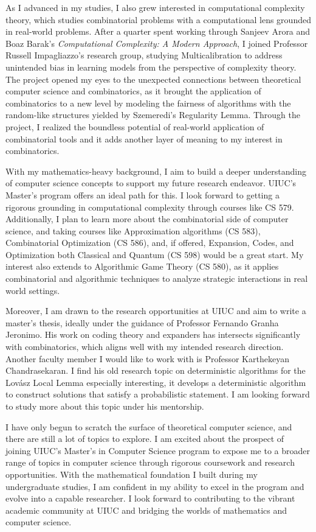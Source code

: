 \documentclass[12pt]{article}
\begin{document}
As I advanced in my studies, I also grew interested in computational complexity theory, which
studies combinatorial problems with a computational lens grounded in real-world problems. After a
quarter spent working through Sanjeev Arora and Boaz Barak's \textit{Computational Complexity: A
Modern Approach}\cite{arora2009computational}, I joined Professor Russell Impagliazzo's research
group, studying Multicalibration to address unintended bias in learning models from the perspective
of complexity theory. The project opened my eyes to the unexpected connections between theoretical
computer science and combinatorics, as it brought the application of combinatorics to a new level by
modeling the fairness of algorithms with the random-like structures yielded by Szemeredi's
Regularity Lemma. Through the project, I realized the boundless potential of real-world application
of combinatorial tools and it adds another layer of meaning to my interest in combinatorics.

With my mathematics-heavy background, I aim to build a deeper understanding of computer science
concepts to support my future research endeavor. UIUC's Master's program offers an ideal path for
this. I look forward to getting a rigorous grounding in computational complexity through courses
like CS 579. Additionally, I plan to learn more about the combinatorial side of computer science,
and taking courses like Approximation algorithms (CS 583), Combinatorial Optimization (CS 586), and,
if offered, Expansion, Codes, and Optimization both Classical and Quantum (CS 598) would be a great
start. My interest also extends to Algorithmic Game Theory (CS 580), as it applies combinatorial and
algorithmic techniques to analyze strategic interactions in real world settings.

Moreover, I am drawn to the research opportunities at UIUC and aim to write a master's thesis,
ideally under the guidance of Professor Fernando Granha Jeronimo. His work on coding theory and
expanders has intersects significantly with combinatorics, which aligns well with my intended
research direction. Another faculty member I would like to work with is Professor Karthekeyan
Chandrasekaran. I find his old research topic on deterministic algorithms for the Lovász Local
Lemma\cite{chandrasekaran2019deterministicalgorithmslovaszlocal} especially interesting, it develops
a deterministic algorithm to construct solutions that satisfy a probabilistic statement. I am
looking forward to study more about this topic under his mentorship.

I have only begun to scratch the surface of theoretical computer science, and there are still a lot
of topics to explore. I am excited about the prospect of joining UIUC's Master's in Computer
Science program to expose me to a broader range of topics in computer science through rigorous
coursework and research opportunities. With the mathematical foundation I built during my
undergraduate studies, I am confident in my ability to excel in the program and evolve into a
capable researcher. I look forward to contributing to the vibrant academic community at UIUC
and bridging the worlds of mathematics and computer science.

\newpage



\end{document}
